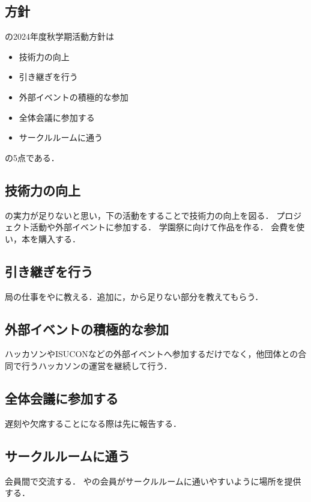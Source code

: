 \subsection*{\newGradeIfKouki{}\thirdGrade{}方針}


\thirdGrade{}の2024年度秋学期活動方針は
\begin{itemize}
    \item 技術力の向上
    \item 引き継ぎを行う
    \item 外部イベントの積極的な参加
    \item 全体会議に参加する
    \item サークルルームに通う
\end{itemize}
の5点である．

\subsection*{技術力の向上}
\thirdGrade{}の実力が足りないと思い，下の活動をすることで技術力の向上を図る．
プロジェクト活動や外部イベントに参加する．
学園祭に向けて作品を作る．
会費を使い，本を購入する．

\subsection*{引き継ぎを行う}
局の仕事を\firstGrade{}や\secondGrade{}に教える．追加に，\fourthGrade{}から足りない部分を教えてもらう．

\subsection*{外部イベントの積極的な参加}
ハッカソンやISUCONなどの外部イベントへ参加するだけでなく，他団体との合同で行うハッカソンの運営を継続して行う．

\subsection*{全体会議に参加する}
遅刻や欠席することになる際は先に報告する．

\subsection*{サークルルームに通う}
会員間で交流する．
\firstGrade{}や\secondGrade{}の会員がサークルルームに通いやすいように場所を提供する．
